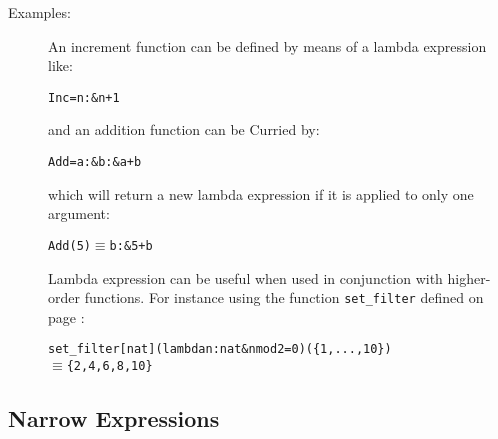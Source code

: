 \documentclass[\pformat,12pt]{article}
\newcommand{\MYEQUIV}{$\equiv$}
\begin{document}
\begin{description}
\item[Examples:] An increment function can be defined by means of a lambda
  expression like:
  \begin{alltt}
    Inc =  n :  \& n + 1
  \end{alltt}
  and an addition function can be Curried by:
  \begin{alltt}
    Add =  a :  \&  b :  \& a + b
  \end{alltt}
  which will return a new lambda expression if it is applied to only one
  argument:
  \begin{alltt}
    Add(5) \(\equiv\)  b :  \& 5 + b
  \end{alltt}
  Lambda expression can be useful when used in conjunction with higher-order 
  functions. For instance using the function \texttt{set\_filter}
  defined on page \pageref{setfilterdef}:
  \begin{alltt}
  set_filter[nat](lambda n:nat & n mod 2 = 0)(\{1,...,10\})
  \MYEQUIV \{2,4,6,8,10\}
  \end{alltt}
\end{description}

\subsection{Narrow Expressions}
\end{document}
